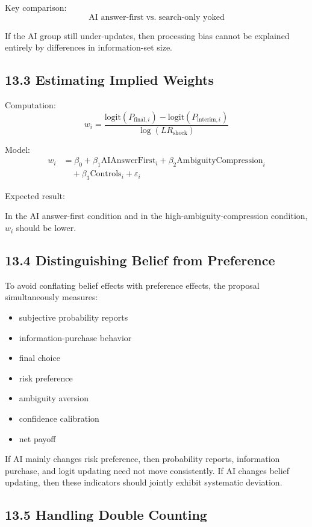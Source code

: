 Key comparison:
\[
\text{AI answer-first} \;\text{vs.}\; \text{search-only yoked}
\]

If the AI group still under-updates, then processing bias cannot be explained entirely by differences in information-set size.

\subsection*{13.3 Estimating Implied Weights}

Computation:
\[
w_i
=
\frac{
\text{logit}(P_{\text{final},i}) - \text{logit}(P_{\text{interim},i})
}{
\log(LR_{\text{shock}})
}
\]

Model:
\[
\begin{aligned}
w_i
&=
\beta_0
+ \beta_1 \text{AIAnswerFirst}_i
+ \beta_2 \text{AmbiguityCompression}_i \\
&\quad
+ \beta_3 \text{Controls}_i
+ \varepsilon_i
\end{aligned}
\]

Expected result:

In the AI answer-first condition and in the high-ambiguity-compression condition, \(w_i\) should be lower.

\subsection*{13.4 Distinguishing Belief from Preference}

To avoid conflating belief effects with preference effects, the proposal simultaneously measures:
\begin{itemize}[leftmargin=1.5em]
\item subjective probability reports
\item information-purchase behavior
\item final choice
\item risk preference
\item ambiguity aversion
\item confidence calibration
\item net payoff
\end{itemize}

If AI mainly changes risk preference, then probability reports, information purchase, and logit updating need not move consistently. If AI changes belief updating, then these indicators should jointly exhibit systematic deviation.

\subsection*{13.5 Handling Double Counting}

